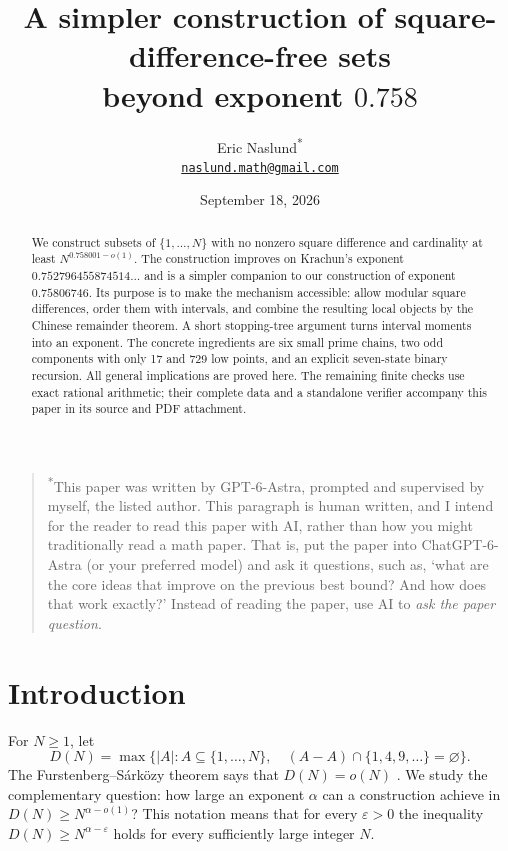 \documentclass[11pt]{article}
\title{A simpler construction of square-difference-free sets\\beyond exponent $0.758$}
\author{Eric Naslund\textsuperscript{*}\\[3pt]
\normalsize\href{mailto:naslund.math@gmail.com}{\texttt{naslund.math@gmail.com}}}
\date{September 18, 2026}
\theoremstyle{definition}
\theoremstyle{remark}
\begin{document}
\maketitle
\begin{quote}
\small\noindent\textsuperscript{*}This paper was written by GPT-6-Astra, prompted and supervised by myself, the listed author.
This paragraph is human written, and I intend for the reader to read this paper with AI, rather than how you might traditionally read a math paper.
That is, put the paper into ChatGPT-6-Astra (or your preferred model) and ask it questions, such as, `what are the core ideas that improve on the previous best bound? And how does that work exactly?'
Instead of reading the paper, use AI to \emph{ask the paper question}.
\end{quote}
\begin{abstract}
We construct subsets of $\{1,\ldots,N\}$ with no nonzero square difference
and cardinality at least $N^{0.758001-o(1)}$. The construction improves on
Krachun's exponent $0.752796455874514\ldots$ and is a simpler companion to
our construction of exponent $0.75806746$. Its purpose is to make the
mechanism accessible: allow modular square differences, order them with
intervals, and combine the resulting local objects by the Chinese remainder
theorem. A short stopping-tree argument turns interval moments into an
exponent. The concrete ingredients are six small prime chains, two odd
components with only 17 and 729 low points, and an explicit seven-state
binary recursion. All general implications are proved here. The remaining
finite checks use exact rational arithmetic; their complete data and a
standalone verifier accompany this paper in its source and PDF attachment.
\end{abstract}

\section{Introduction}
For $N\ge1$, let
\[
 D(N)=\max\bigl\{|A|:A\subseteq\{1,\ldots,N\},\quad
 (A-A)\cap\{1,4,9,\ldots\}=\varnothing\bigr\}.
\]
The Furstenberg--S\'ark\"ozy theorem says that $D(N)=o(N)$
\cite{Furstenberg1977,Sarkozy1978}. We study the complementary question:
how large an exponent $\alpha$ can a construction achieve in
$D(N)\ge N^{\alpha-o(1)}$? This notation means that for every
$\varepsilon>0$ the inequality $D(N)\ge N^{\alpha-\varepsilon}$ holds
for every sufficiently large integer $N$.
\end{document}
